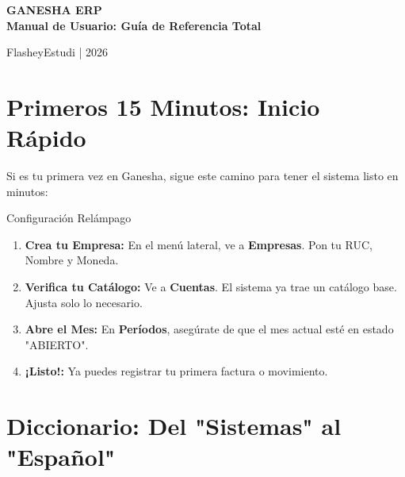 \documentclass[12pt, landscape, oneside]{book}
\begin{document}
\begin{titlepage}
    \centering
    \vspace*{3cm}
    {\fontsize{50}{60}\selectfont\bfseries\color{CorporateBlue} GANESHA ERP}\\[1cm]
    {\huge\bfseries\color{CorporateGold} Manual de Usuario: Guía de Referencia Total}\\[2cm]
    
    
    \vfill
    {\large FlasheyEstudi | 2026}
\end{titlepage}

\tableofcontents

\chapter{Primeros 15 Minutos: Inicio Rápido}

Si es tu primera vez en Ganesha, sigue este camino para tener el sistema listo en minutos:

\begin{pasos}{Configuración Relámpago}
    \begin{enumerate}
        \item \textbf{Crea tu Empresa:} En el menú lateral, ve a \textbf{Empresas}. Pon tu RUC, Nombre y Moneda.
        \item \textbf{Verifica tu Catálogo:} Ve a \textbf{Cuentas}. El sistema ya trae un catálogo base. Ajusta solo lo necesario.
        \item \textbf{Abre el Mes:} En \textbf{Períodos}, asegúrate de que el mes actual esté en estado "ABIERTO".
        \item \textbf{¡Listo!:} Ya puedes registrar tu primera factura o movimiento.
    \end{enumerate}
\end{pasos}

\chapter{Diccionario: Del "Sistemas" al "Español"}
\end{document}
